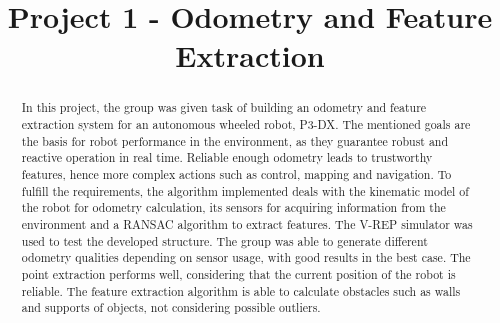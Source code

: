 \documentclass[twoside,conference,a4paper]{IEEEtran}
\begin{document}
\renewcommand{\IEEEkeywordsname}{Keywords}



\title{Project 1 - Odometry and Feature Extraction}
\author{%
}


\maketitle

\begin{abstract}
    In this project, the group was given task of building an odometry and feature extraction system for an autonomous wheeled robot, P3-DX. The mentioned goals are the basis for robot performance in the environment, as they guarantee robust and reactive operation in real time. Reliable enough odometry leads to trustworthy features, hence more complex actions such as control, mapping and navigation. To fulfill the requirements, the algorithm implemented deals with the kinematic model of the robot for odometry calculation, its sensors for acquiring information from the environment and a RANSAC algorithm to extract features. The V-REP simulator was used to test the developed structure. The group was able to generate different odometry qualities depending on sensor usage, with good results in the best case. The point extraction performs well, considering that the current position of the robot is reliable. The feature extraction algorithm is able to calculate obstacles such as walls and supports of objects, not considering possible outliers.
\end{abstract}
\end{document}
